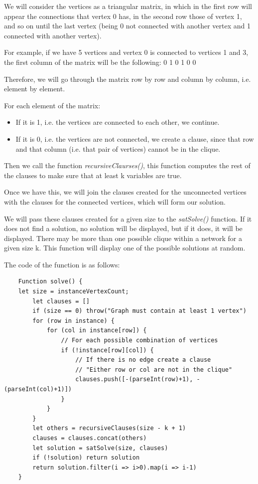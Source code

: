 \documentclass[table]{article}
\begin{document}
\leftskip=0.5in
We will consider the vertices as a triangular matrix, in which in the first row will appear the connections that vertex 0 has, in the second row those of vertex 1, and so on until the last vertex (being 0 not connected with another vertex and 1 connected with another vertex).\newline

For example, if we have 5 vertices and vertex 0 is connected to vertices 1 and 3, the first column of the matrix will be the following: 0 1 0 1 0 0

Therefore, we will go through the matrix row by row and column by column, i.e. element by element. 

For each element of the matrix:

\begin{itemize}\leftskip=0.8in
\item If it is 1, i.e. the vertices are connected to each other, we continue.
\item If it is 0, i.e. the vertices are not connected, we create a clause, since that row and that column (i.e. that pair of vertices) cannot be in the clique.
\end{itemize}

\leftskip=0.5in
Then we call the function \textit{recursiveClaurses()}, this function computes the rest of the clauses to make sure that at least k variables are true.

Once we have this, we will join the clauses created for the unconnected vertices with the clauses for the connected vertices, which will form our solution.

We will pass these clauses created for a given size to the \textit{satSolve()} function. If it does not find a solution, no solution will be displayed, but if it does, it will be displayed. There may be more than one possible clique within a network for a given size k. This function will display one of the possible solutions at random.\newline

The code of the function is as follows:

\begin{lstlisting}
    Function solve() {
	let size = instanceVertexCount;
    	let clauses = []
        if (size == 0) throw("Graph must contain at least 1 vertex")
        for (row in instance) {
            for (col in instance[row]) {
                // For each possible combination of vertices
                if (!instance[row][col]) {
                    // If there is no edge create a clause
                    // "Either row or col are not in the clique"
                    clauses.push([-(parseInt(row)+1), -(parseInt(col)+1)])
                }
            }
        }
        let others = recursiveClauses(size - k + 1)
        clauses = clauses.concat(others)
        let solution = satSolve(size, clauses)
        if (!solution) return solution 
        return solution.filter(i => i>0).map(i => i-1)
    }

\end{lstlisting}
\end{document}
